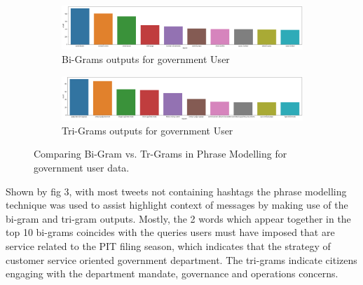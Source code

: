 \begin{figure}
      \centering
	    \begin{subfigure}{0.3\linewidth}
		\includegraphics[width=\linewidth]{Bigrams User Data.png}
		\caption{Bi-Grams outputs for government User}
		\label{fig: Associated Bi-Grams Outputs}
	   \end{subfigure}
	   \begin{subfigure}{0.3\linewidth}
		\includegraphics[width=\linewidth]{Tri-gram User Data.png}
		\caption{Tri-Grams outputs for government User}
		\label{fig:Associated Tri-Gram Outputs}
	    \end{subfigure}
	   \vfill
	 \caption{Comparing Bi-Gram vs. Tr-Grams in Phrase Modelling for government user data.}
\end{figure}

Shown by fig 3, with most tweets not containing hashtags the phrase modelling technique was used to assist highlight context of messages by making use of the bi-gram and tri-gram outputs. Mostly, the 2 words which appear together in the top 10 bi-grams coincides with the queries users must have imposed that are service related to the PIT filing season, which indicates that the strategy of customer service oriented government department.  The tri-grams indicate citizens engaging with the department mandate, governance and operations concerns.

